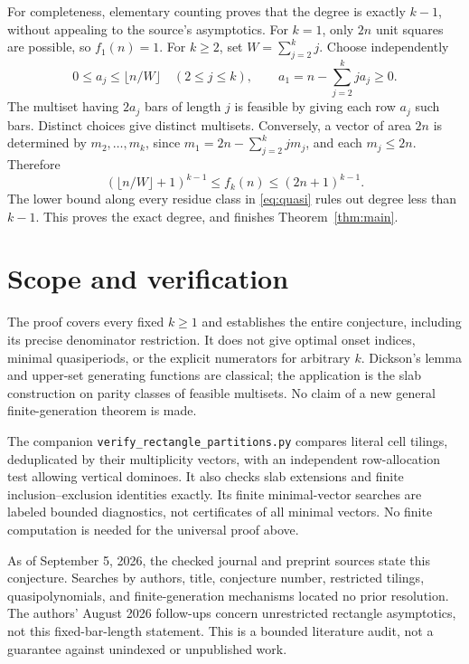 \documentclass[11pt]{article}
\begin{document}
For completeness, elementary counting proves that the degree is
exactly $k-1$, without appealing to the source's asymptotics.
For $k=1$, only $2n$ unit squares are possible, so $f_1(n)=1$.
For $k\geq2$, set $W=\sum_{j=2}^k j$. Choose independently
\[
 0\leq a_j\leq\lfloor n/W\rfloor\quad(2\leq j\leq k),
 \qquad a_1=n-\sum_{j=2}^k ja_j\geq0.
\]
The multiset having $2a_j$ bars of length $j$ is feasible by giving
each row $a_j$ such bars. Distinct choices give distinct multisets.
Conversely, a vector of area $2n$ is determined by $m_2,\ldots,m_k$,
since $m_1=2n-\sum_{j=2}^k jm_j$, and each $m_j\leq2n$.
Therefore
\[
 (\lfloor n/W\rfloor+1)^{k-1}
 \leq f_k(n)\leq(2n+1)^{k-1}.
\]
The lower bound along every residue class in \eqref{eq:quasi} rules
out degree less than $k-1$. This proves the exact degree, and finishes
Theorem~\ref{thm:main}.

\section{Scope and verification}
The proof covers every fixed $k\geq1$ and establishes the entire
conjecture, including its precise denominator restriction. It does not
give optimal onset indices, minimal quasiperiods, or the explicit
numerators for arbitrary $k$. Dickson's lemma and upper-set generating
functions are classical; the application is the slab construction on
parity classes of feasible multisets. No claim of a new general
finite-generation theorem is made.

The companion \texttt{verify\_rectangle\_partitions.py} compares
literal cell tilings, deduplicated by their multiplicity vectors,
with an independent row-allocation test allowing vertical dominoes.
It also checks slab extensions and finite inclusion--exclusion
identities exactly. Its finite minimal-vector searches are labeled
bounded diagnostics, not certificates of all minimal vectors.
No finite computation is needed for the universal proof above.

As of September 5, 2026, the checked journal and preprint sources
state this conjecture. Searches by authors, title, conjecture number,
restricted tilings, quasipolynomials, and finite-generation mechanisms
located no prior resolution. The authors' August 2026 follow-ups
\cite{note,asymptotic} concern unrestricted rectangle asymptotics,
not this fixed-bar-length statement. This is a bounded literature
audit, not a guarantee against unindexed or unpublished work.
\end{document}
